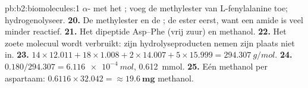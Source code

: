 \begin{solution}{pb:b2:biomolecules:1}
$\alpha$- met het ; voeg de methylester van L-fenylalanine toe; hydrogenolyseer.
\textbf{20.} De methylester en de ; de ester eerst, want een amide is veel minder reactief.
\textbf{21.} Het dipeptide Asp--Phe (vrij zuur) en methanol.
\textbf{22.} Het zoete molecuul wordt verbruikt: zijn hydrolyseproducten nemen zijn plaats niet in.
\textbf{23.} $14 \times 12.011 + 18 \times 1.008 + 2 \times 14.007 + 5 \times 15.999 =
\qty{294.307}{g/mol}$.
\textbf{24.} $0.180/294.307 = \qty{6.116e-4}{mol}$, \qty{0.612}{mmol}.
\textbf{25.} Eén methanol per aspartaam: $0.6116 \times 32.042 = \boldsymbol{\approx \qty{19.6}{mg}}$
methanol.
\end{solution}
